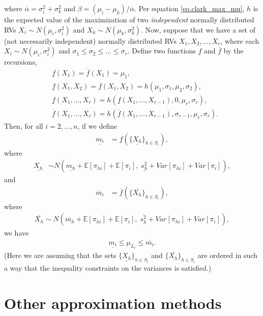 \documentclass[12pt]{article}
\def\E{\mathbb{E}}
\begin{document}
where $\overline{\alpha} = \sigma_i^2 + \sigma_k^2$ and $\beta = (\mu_i - \mu_k)/ \overline{\alpha}$. Per equation \eqref{eq.clark_max_mu}, $h$ is the expected value of the maximization of two {\em independent} normally distributed RVs $X_i \sim N(\mu_i, \sigma_i^2)$ and $X_k \sim N(\mu_k, \sigma_k^2)$. Now, suppose that we have a set of (not necessarily independent) normally distributed RVs $X_1, X_2, \dots, X_r$, where each $X_i \sim N(\mu_i, \sigma_i^2)$ and $\sigma_1 \leq \sigma_2 \leq \dots \leq \sigma_r$. Define two functions $\underline{f}$ and $\overline{f}$ by the recursions,
\begin{align*}
  &\underline{f}(X_1) = \overline{f}(X_1) = \mu_1, \\
  &\underline{f}(X_1, X_2) = \overline{f}(X_1, X_2) = h(\mu_1, \sigma_1, \mu_2, \sigma_2), \\
  &\underline{f}(X_1, \dots, X_r) = h(\underline{f}(X_1, \dots, X_{r - 1}), 0, \mu_r, \sigma_r), \\
  &\overline{f}(X_1, \dots, X_r) = h(\overline{f}(X_1, \dots, X_{r - 1}), \sigma_{r - 1}, \mu_r, \sigma_r).
\end{align*}
Then, for all $i = 2, \dots, n$, if we define
\begin{align*}
  \underline{m_i} &= \underline{f}(\{ \underline{X_h} \}_{h \in S_i}),
\end{align*}
where
\begin{align*}
  \underline{X_h} &\sim N(\underline{m_h} + \E[\pi_{hi}] + \E[\pi_{i}], \; \underline{s_h^2} + Var[\pi_{hi}] + Var[\pi_{i}]),
\end{align*}
and
\begin{align*}
  \overline{m_i} &= \overline{f}(\{\overline{X_h}\}_{h \in S_i}),
\end{align*}
where
\begin{align*}
  \overline{X_h} \sim N(\overline{m_h} + \E[\pi_{hi}] + \E[\pi_{i}], \; \overline{s_h^2} + Var[\pi_{hi}] + Var[\pi_{i}]),
  \end{align*}
we have 
\begin{align*}
  \underline{m_i} \leq \mu_{L_i} \leq \overline{m_i}.
\end{align*}
(Here we are assuming that the sets $\{\underline{X_h}\}_{h \in S_i}$ and $\{\overline{X_h}\}_{h \in S_i}$ are ordered in such a way that the inequality constraints on the variances is satisfied.)


\section{Other approximation methods}
\label{sect.other_methods} 
\end{document}
